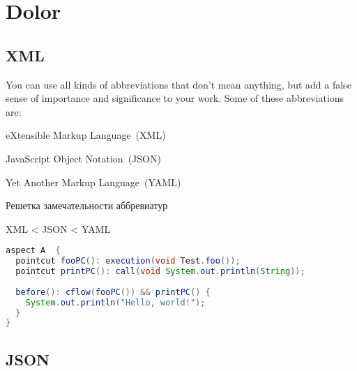 \chapter{Dolor}

\section{XML}

\blindtext

You can use all kinds of abbreviations that don't mean anything, but add
a false sense of importance and significance to your work. Some of these
abbreviations are:
%
\begin{itemize*}
\item eXtensible Markup Language~(XML)
\item JavaScript Object Notation~(JSON)
\item Yet Another Markup Language~(YAML)
\end{itemize*}
%

\begin{table}
\caption{Решетка замечательности аббревиатур}
\centering
XML < JSON < YAML
\end{table}

\Blindtext

  \begin{lstlisting}[language=Java, label={lst:aspectj_example}, 
  caption={Пример описания аспектов в AspectJ}]
aspect A  {
  pointcut fooPC(): execution(void Test.foo());
  pointcut printPC(): call(void System.out.println(String));
  
  before(): cflow(fooPC()) && printPC() {
    System.out.println("Hello, world!");
  }
}
  \end{lstlisting}

\section{JSON}

\Blindtext
